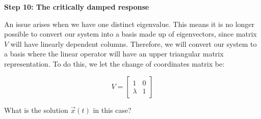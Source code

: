 \qitem \textbf{Step 10: The critically damped response}

An issue arises when we have one distinct eigenvalue. This means it is no longer possible to convert our system into a basis made up of eigenvectors, since matrix $V$ will have linearly dependent columns. Therefore, we will convert our system to a basis where the linear operator will have an upper triangular matrix representation. To do this, we let the change of coordinates matrix be:

$$ V = \begin{bmatrix} 1 & 0 \\ \lambda & 1 \end{bmatrix} $$

What is the solution $\vec{x}(t)$ in this case?

